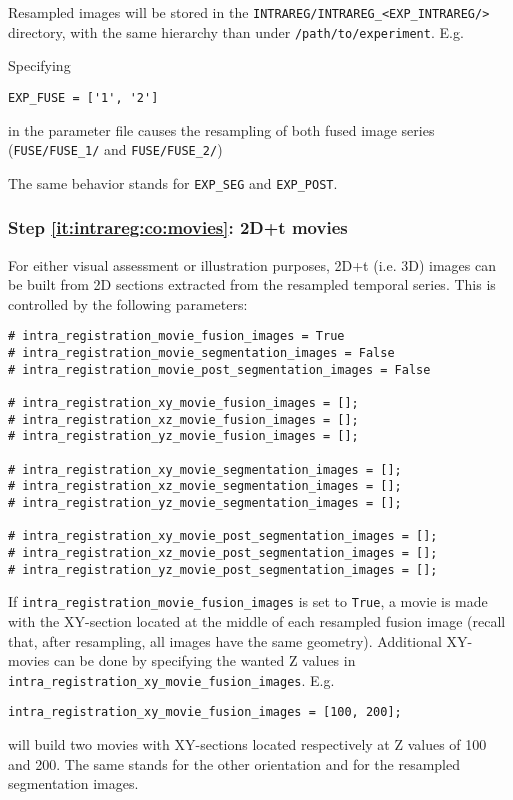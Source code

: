 Resampled images will be stored in the
\texttt{INTRAREG/INTRAREG\_<EXP\_INTRAREG/>} directory, with the same
hierarchy than under \texttt{/path/to/experiment}. E.g. 

\mbox{}
\mbox{}

Specifying
\begin{verbatim}
EXP_FUSE = ['1', '2']
\end{verbatim}
in the parameter file causes the resampling of both fused image series
(\texttt{FUSE/FUSE\_1/} and \texttt{FUSE/FUSE\_2/})

\mbox{}
\mbox{}

The same behavior stands for \texttt{EXP\_SEG} and  \texttt{EXP\_POST}.


\subsubsection{Step \ref{it:intrareg:co:movies}: 2D+t movies}
\label{sec:cli:intraregistration:movies}
For either visual assessment or illustration purposes, 2D+t (i.e. 3D) images can be built from 2D sections extracted from the resampled temporal series. This is controlled by the following parameters:
\begin{verbatim}
# intra_registration_movie_fusion_images = True
# intra_registration_movie_segmentation_images = False
# intra_registration_movie_post_segmentation_images = False

# intra_registration_xy_movie_fusion_images = [];
# intra_registration_xz_movie_fusion_images = [];
# intra_registration_yz_movie_fusion_images = [];

# intra_registration_xy_movie_segmentation_images = [];
# intra_registration_xz_movie_segmentation_images = [];
# intra_registration_yz_movie_segmentation_images = [];

# intra_registration_xy_movie_post_segmentation_images = [];
# intra_registration_xz_movie_post_segmentation_images = [];
# intra_registration_yz_movie_post_segmentation_images = [];
\end{verbatim}

If \verb|intra_registration_movie_fusion_images| is set to \verb|True|, a movie is made with the  XY-section located at the middle of each resampled fusion image (recall that, after resampling, all images have the same geometry). Additional XY-movies can be done by specifying the wanted Z values in \verb|intra_registration_xy_movie_fusion_images|. E.g.
\begin{verbatim}
intra_registration_xy_movie_fusion_images = [100, 200];
\end{verbatim}
will build two movies with XY-sections located respectively at Z values of 100 and 200. The same stands for the other orientation and for the resampled segmentation images.

